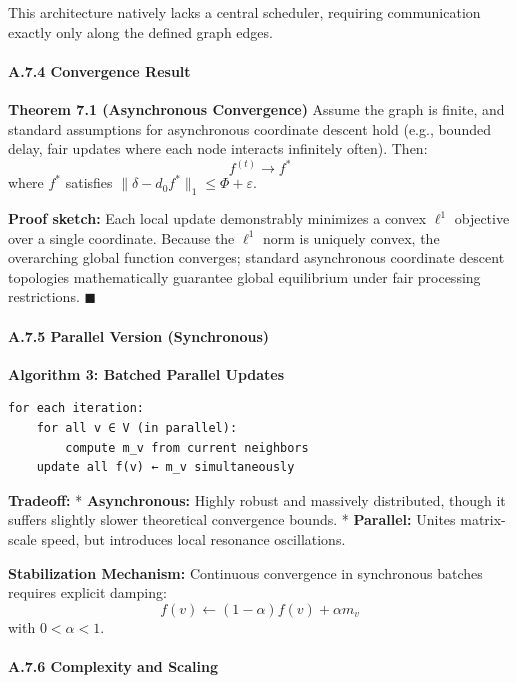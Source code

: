 \documentclass[
]{article}
\begin{document}
This architecture natively lacks a central scheduler, requiring
communication exactly only along the defined graph edges.

\paragraph{A.7.4 Convergence Result}\label{a.7.4-convergence-result}

\textbf{Theorem 7.1 (Asynchronous Convergence)} Assume the graph is
finite, and standard assumptions for asynchronous coordinate descent
hold (e.g., bounded delay, fair updates where each node interacts
infinitely often). Then: \[ f^{(t)} \rightarrow f^* \] where \(f^*\)
satisfies \(\|\delta - d_0 f^*\|_1 \leq \Phi + \varepsilon\).

\textbf{Proof sketch:} Each local update demonstrably minimizes a convex
\(\ell^1\) objective over a single coordinate. Because the \(\ell^1\)
norm is uniquely convex, the overarching global function converges;
standard asynchronous coordinate descent topologies mathematically
guarantee global equilibrium under fair processing restrictions.
\(\blacksquare\)

\paragraph{A.7.5 Parallel Version
(Synchronous)}\label{a.7.5-parallel-version-synchronous}

\textbf{Algorithm 3: Batched Parallel Updates}

\begin{verbatim}
for each iteration:
    for all v ∈ V (in parallel):
        compute m_v from current neighbors
    update all f(v) ← m_v simultaneously
\end{verbatim}

\textbf{Tradeoff:} * \textbf{Asynchronous:} Highly robust and massively
distributed, though it suffers slightly slower theoretical convergence
bounds. * \textbf{Parallel:} Unites matrix-scale speed, but introduces
local resonance oscillations.

\textbf{Stabilization Mechanism:} Continuous convergence in synchronous
batches requires explicit damping:
\[ f(v) \leftarrow (1 - \alpha) f(v) + \alpha m_v \] with
\(0 < \alpha < 1\).

\paragraph{A.7.6 Complexity and
Scaling}\label{a.7.6-complexity-and-scaling}
\end{document}
